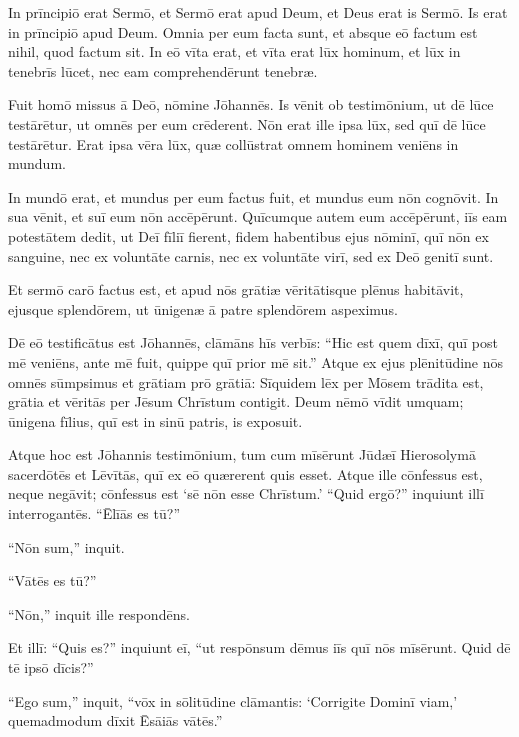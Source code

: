 

\Caput
\Versus In prīncipiō erat Sermō, et Sermō erat apud Deum, et Deus erat is Sermō.
\Versus Is erat in prīncipiō apud Deum.
\Versus Omnia per eum facta sunt, et absque eō factum est nihil, quod factum sit.
\Versus In eō vīta erat, et vīta erat lūx hominum,
\Versus et lūx in tenebrīs lūcet, nec eam comprehendērunt tenebræ.

\Versus Fuit homō missus ā Deō, nōmine Jōhannēs.
\Versus Is vēnit ob testimōnium, ut dē lūce testārētur, ut omnēs per eum crēderent.
\Versus Nōn erat ille ipsa lūx, sed quī dē lūce testārētur.
\Versus Erat ipsa vēra lūx, quæ collūstrat omnem hominem veniēns in mundum.

\Versus In mundō erat, et mundus per eum factus fuit, et mundus eum nōn cognōvit.
\Versus In sua vēnit, et suī eum nōn accēpērunt.
\Versus Quīcumque autem eum accēpērunt, iīs eam potestātem dedit, ut Deī fīliī fierent, fidem habentibus ejus nōminī,
\Versus quī nōn ex sanguine, nec ex voluntāte carnis, nec ex voluntāte virī, sed ex Deō genitī sunt.

\Versus Et sermō carō factus est, et apud nōs grātiæ vēritātisque plēnus habitāvit, ejusque splendōrem, ut ūnigenæ ā patre splendōrem aspeximus.

\Versus Dē eō testificātus est Jōhannēs, clāmāns hīs verbīs: ``Hic est quem dīxī, quī post mē veniēns, ante mē fuit, quippe quī prior mē sit.''
\Versus Atque ex ejus plēnitūdine nōs omnēs sūmpsimus et grātiam prō grātiā:
\Versus Sīquidem lēx per Mōsem trādita est, grātia et vēritās per Jēsum Chrīstum contigit.
\Versus Deum nēmō vīdit umquam; ūnigena fīlius, quī est in sinū patris, is exposuit.

\Versus Atque hoc est Jōhannis testimōnium, tum cum mīsērunt Jūdæī Hierosolymā sacerdōtēs et Lēvītās, quī ex eō quærerent quis esset.
\Versus Atque ille cōnfessus est, neque negāvit; cōnfessus est `sē nōn esse Chrīstum.'
\Versus ``Quid ergō?'' inquiunt illī interrogantēs. ``Ēlīās es tū?''

``Nōn sum,'' inquit.

``Vātēs es tū?''

``Nōn,'' inquit ille respondēns.

\Versus Et illī: ``Quis es?'' inquiunt eī, ``ut respōnsum dēmus iīs quī nōs mīsērunt. Quid dē tē ipsō dīcis?''

\Versus ``Ego sum,'' inquit, ``vōx in sōlitūdine clāmantis: `Corrigite Dominī viam,' quemadmodum dīxit Ēsāiās vātēs.''

